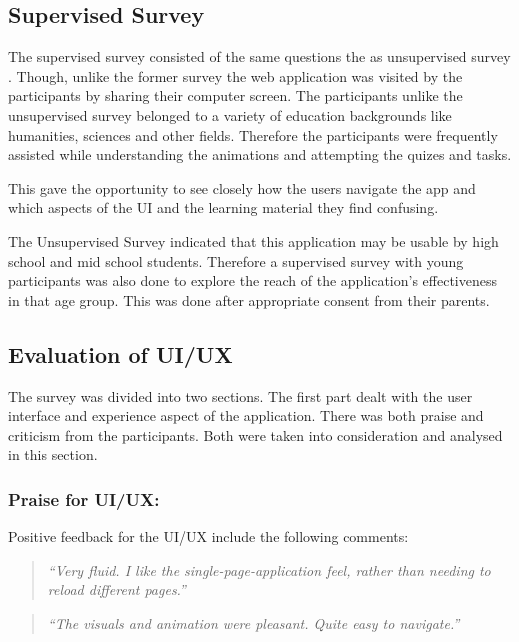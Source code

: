 \subsection{Supervised Survey}
The supervised survey consisted of the same questions the as unsupervised
survey . Though, unlike the former survey the web application was visited by
the participants by sharing their computer screen. The participants unlike the
unsupervised survey belonged to a variety of education backgrounds like
humanities, sciences and other fields. Therefore the participants were
frequently assisted while understanding the animations and attempting the
quizes and tasks.

This gave the opportunity to see closely how the users navigate the app and
which aspects of the UI and the learning material they find confusing.

The Unsupervised Survey indicated that this application may be usable by high
school and mid school students. Therefore a supervised survey with young
participants was also done to explore the reach of the application's
effectiveness in that age group. This was done after appropriate consent from
their parents.

\subsection{Evaluation of UI/UX}
The survey was divided into two sections. The first part dealt with the user interface
and experience aspect of the application. There was both praise and criticism
from the participants. Both were taken into consideration and analysed
in this section.



\subsubsection{Praise for UI/UX:}
Positive feedback for the UI/UX include the following comments:

\begin{quote}
\emph{``Very fluid. I like the single-page-application feel, rather than
       needing to reload different pages.''}
\end{quote}



\begin{quote}
\emph{``The visuals and animation were pleasant. Quite easy to navigate.''}
\end{quote}




